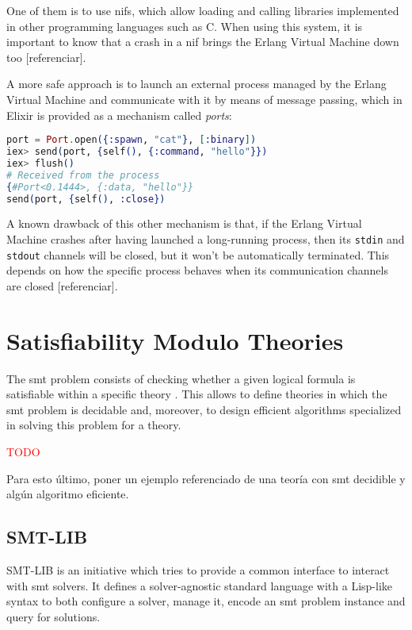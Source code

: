 One of them is to use \gls{nif}s, which allow loading and calling libraries
implemented in other programming languages such as C. When using this system,
it is important to know that a crash in a \gls{nif} brings the Erlang Virtual 
Machine down too [referenciar].

A more safe approach is to launch an external process managed by the Erlang
Virtual Machine and communicate with it by means of message passing, which in 
Elixir is provided as a mechanism called \textit{ports}:

\begin{lstlisting}[language=elixir,numbers=none,frame=none]
port = Port.open({:spawn, "cat"}, [:binary])
iex> send(port, {self(), {:command, "hello"}})
iex> flush()
# Received from the process
{#Port<0.1444>, {:data, "hello"}} 
send(port, {self(), :close})
\end{lstlisting}

A known drawback of this other mechanism is that, if the Erlang Virtual 
Machine crashes after having launched a long-running process, then its \verb|stdin| 
and \verb|stdout| channels will be closed, but it won't be automatically terminated.
This depends on how the specific process behaves when its communication channels are
closed [referenciar].

\section{Satisfiability Modulo Theories}

The \gls{smt} problem consists of checking whether
a given logical formula is satisfiable within a specific theory
\citep{smtLibStandard}. This allows to define theories in which the \gls{smt} problem
is decidable and, moreover, to design efficient algorithms specialized in 
solving this problem for a theory.

\textcolor{red}{TODO}

Para esto último, poner un ejemplo referenciado de una teoría con \gls{smt} decidible y algún 
algoritmo eficiente.

\subsection{SMT-LIB}
\label{prelim:smtlib}

SMT-LIB is an initiative which tries to provide a common interface to interact
with \acrshort{smt} solvers. It defines a solver-agnostic standard language
with a Lisp-like syntax to both configure a solver, manage it, encode an
\gls{smt} problem instance and query for solutions.


